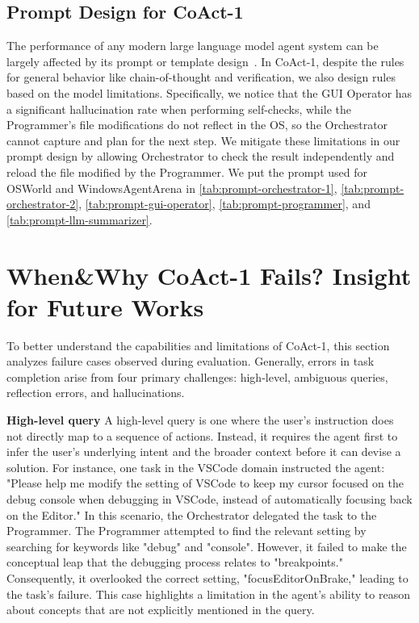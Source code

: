 \documentclass{article} %
\newcommand{\ours}{CoAct-1\xspace}
\begin{document}
\subsection{Prompt Design for \ours}
The performance of any modern large language model agent system can be largely affected by its prompt or template design~\citep{he2024doespromptformattingimpact}. In \ours, despite the rules for general behavior like chain-of-thought and verification, we also design rules based on the model limitations. Specifically, we notice that the GUI Operator has a significant hallucination rate when performing self-checks, while the Programmer's file modifications do not reflect in the OS, so the Orchestrator cannot capture and plan for the next step. We mitigate these limitations in our prompt design by allowing Orchestrator to check the result independently and reload the file modified by the Programmer. We put the prompt used for OSWorld and WindowsAgentArena in \autoref{tab:prompt-orchestrator-1}, \autoref{tab:prompt-orchestrator-2}, \autoref{tab:prompt-gui-operator}, \autoref{tab:prompt-programmer}, and \autoref{tab:prompt-llm-summarizer}.



\section{When\&Why \ours Fails? Insight for Future Works}
To better understand the capabilities and limitations of \ours, this section analyzes failure cases observed during evaluation. Generally, errors in task completion arise from four primary challenges: high-level, ambiguous queries, reflection errors, and hallucinations.

\textbf{High-level query} A high-level query is one where the user's instruction does not directly map to a sequence of actions. Instead, it requires the agent first to infer the user's underlying intent and the broader context before it can devise a solution.
For instance, one task in the VSCode domain instructed the agent: "Please help me modify the setting of VSCode to keep my cursor focused on the debug console when debugging in VSCode, instead of automatically focusing back on the Editor."  In this scenario, the Orchestrator delegated the task to the Programmer. The Programmer attempted to find the relevant setting by searching for keywords like "debug" and "console". However, it failed to make the conceptual leap that the debugging process relates to "breakpoints." Consequently, it overlooked the correct setting, "focusEditorOnBrake," leading to the task's failure. This case highlights a limitation in the agent's ability to reason about concepts that are not explicitly mentioned in the query.
\end{document}
